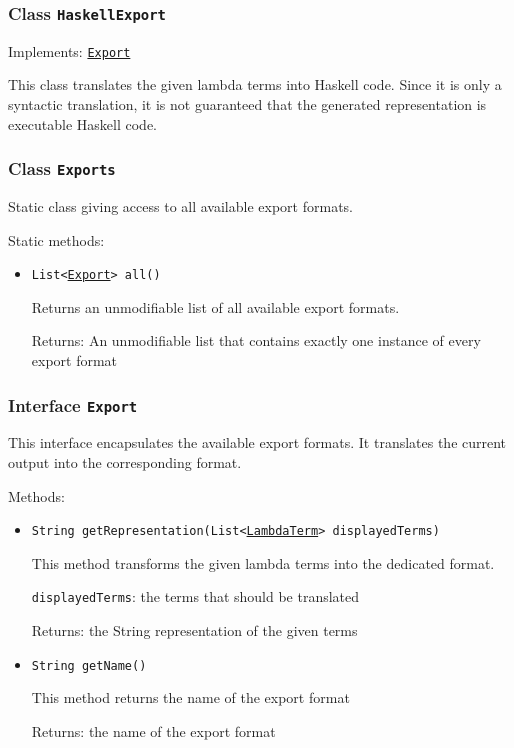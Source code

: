 \subsubsection{Class \texttt{HaskellExport}}
\label{type:edu.kit.wavelength.client.view.export.HaskellExport}
Implements: \texttt{\hyperref[type:edu.kit.wavelength.client.view.export.Export]{Export}}

This class translates the given lambda terms into Haskell code. Since it is
 only a syntactic translation, it is not guaranteed that the generated
 representation is executable Haskell code.

\subsubsection{Class \texttt{Exports}}
\label{type:edu.kit.wavelength.client.view.export.Exports}
Static class giving access to all available export formats.

Static methods:
\begin{itemize}
\item \texttt{List<\hyperref[type:edu.kit.wavelength.client.view.export.Export]{Export}> all()}

Returns an unmodifiable list of all available export formats.

Returns: An unmodifiable list that contains exactly one instance of every
         export format

\end{itemize}

\subsubsection{Interface \texttt{Export}}
\label{type:edu.kit.wavelength.client.view.export.Export}
This interface encapsulates the available export formats. It translates the
 current output into the corresponding format.

Methods:
\begin{itemize}
\item \texttt{String getRepresentation(List<\hyperref[type:edu.kit.wavelength.client.model.term.LambdaTerm]{LambdaTerm}> displayedTerms)}

This method transforms the given lambda terms into the dedicated format.

\texttt{displayedTerms}: the terms that should be translated

Returns: the String representation of the given terms

\item \texttt{String getName()}

This method returns the name of the export format

Returns: the name of the export format

\end{itemize}

